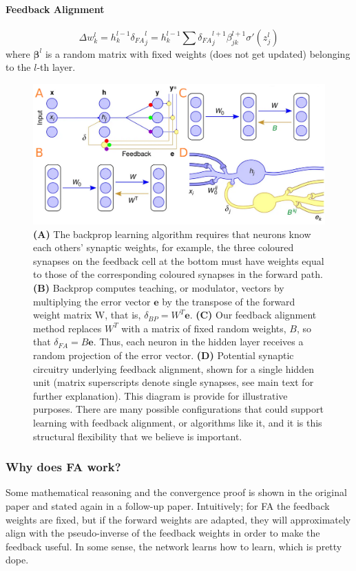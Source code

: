 \documentclass[main]{subfiles}
\begin{document}
\paragraph{Feedback Alignment}
\begin{equation}
    \Delta w_k^l = h_k^{l-1} {\delta_{FA}}_j^l = h_k^{l-1} \sum {\delta_{FA}}_j^{l+1} \beta_{j k}^{l+1} \sigma'(z_j^l)
\end{equation}
where $\bm{\beta}^l$ is a random matrix with fixed weights (does not get updated) belonging to the $l$-th layer.
\begin{figure}[H]
	\centering
	\includegraphics[width=0.99\linewidth]{02_TrainingMethodsForDeepANNs/figures/feedback_alignment.png}
	\caption{\textbf{(A)} The backprop learning algorithm requires that neurons know each others’ synaptic weights, for example, the three coloured synapses on the feedback cell at the bottom must have weights equal to those of the corresponding coloured synapses in the forward path. \textbf{(B)} Backprop computes teaching, or modulator, vectors by multiplying the error vector $\bm{e}$ by the transpose of the forward weight matrix W, that is, $\delta_{BP}=W^T\bm{e}$. \textbf{(C)} Our feedback alignment method replaces $W^T$ with a matrix of fixed random weights, $B$, so that $\delta_{FA}=B\bm{e}$. Thus, each neuron in the hidden layer receives a random projection of the error vector. \textbf{(D)} Potential synaptic circuitry underlying feedback alignment, shown for a single hidden unit (matrix superscripts denote single synapses, see main text for further explanation). This diagram is provide for illustrative purposes. There are many possible configurations that could support learning with feedback alignment, or algorithms like it, and it is this structural flexibility that we believe is important.}
	\label{fig:feedbackalignment}
\end{figure}

\subsubsection{Why does FA work?}
Some mathematical reasoning and the convergence proof is shown in the original paper and stated again in a follow-up paper. Intuitively; for FA the feedback weights are fixed, but if the forward weights are adapted, they will approximately align with the pseudo-inverse of the feedback weights in order to make the feedback useful. In some sense, the network learns how to learn, which is pretty dope.
\end{document}
